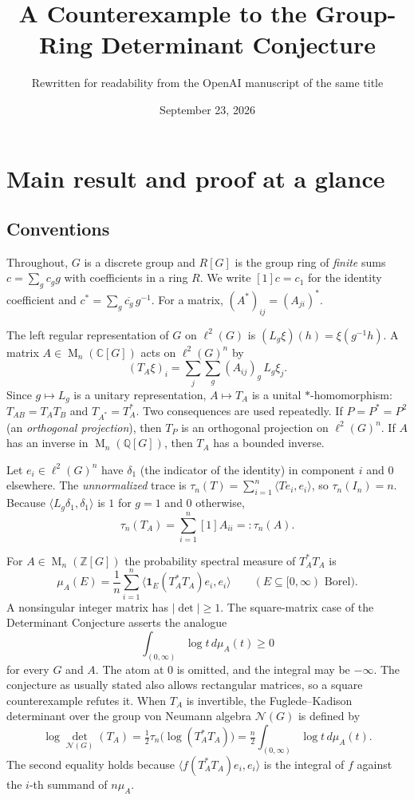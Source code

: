 \documentclass[11pt]{article}
\title{A Counterexample to the Group-Ring Determinant Conjecture}
\author{Rewritten for readability from the OpenAI manuscript of the same title}
\date{September 23, 2026}
\theoremstyle{remark}
\numberwithin{equation}{section}
\newcommand{\Z}{\mathbb Z}
\newcommand{\Q}{\mathbb Q}
\newcommand{\C}{\mathbb C}
\newcommand{\Mat}{\operatorname{M}}
\newcommand{\N}{\mathcal N}
\begin{document}
\maketitle

\section{Main result and proof at a glance}
\label{sec:introduction}

\subsection*{Conventions}

Throughout, $G$ is a discrete group and $R[G]$ is the group ring of \emph{finite} sums $c=\sum_g c_g g$ with coefficients in a ring $R$. We write $[1]c=c_1$ for the identity coefficient and $c^*=\sum_g\overline{c_g}\,g^{-1}$. For a matrix, $(A^*)_{ij}=(A_{ji})^*$.

The left regular representation of $G$ on $\ell^2(G)$ is $(L_g\xi)(h)=\xi(g^{-1}h)$. A matrix $A\in\Mat_n(\C[G])$ acts on $\ell^2(G)^n$ by
\[
 (T_A\xi)_i=\sum_{j}\sum_g (A_{ij})_g\,L_g\xi_j .
\]
Since $g\mapsto L_g$ is a unitary representation, $A\mapsto T_A$ is a unital $*$-homomorphism: $T_{AB}=T_AT_B$ and $T_{A^*}=T_A^*$. Two consequences are used repeatedly. If $P=P^*=P^2$ (an \emph{orthogonal projection}), then $T_P$ is an orthogonal projection on $\ell^2(G)^n$. If $A$ has an inverse in $\Mat_n(\Q[G])$, then $T_A$ has a bounded inverse.

Let $e_i\in\ell^2(G)^n$ have $\delta_1$ (the indicator of the identity) in component $i$ and $0$ elsewhere. The \emph{unnormalized} trace is $\tau_n(T)=\sum_{i=1}^n\langle Te_i,e_i\rangle$, so $\tau_n(I_n)=n$. Because $\langle L_g\delta_1,\delta_1\rangle$ is $1$ for $g=1$ and $0$ otherwise,
\[
 \tau_n(T_A)=\sum_{i=1}^n[1]A_{ii}=: \tau_n(A).
\]

For $A\in\Mat_n(\Z[G])$ the probability spectral measure of $T_A^*T_A$ is
\[
 \mu_A(E)=\frac1n\sum_{i=1}^n\langle \mathbf1_E(T_A^*T_A)e_i,e_i\rangle
 \qquad(E\subseteq[0,\infty)\text{ Borel}).
\]
A nonsingular integer matrix has $|\det|\ge1$. The square-matrix case of the Determinant Conjecture \cite[Conjecture 13.2]{Luck2002} asserts the analogue
\begin{equation}\label{eq:conjecture}
 \int_{(0,\infty)}\log t\,d\mu_A(t)\ge0
\end{equation}
for every $G$ and $A$. The atom at $0$ is omitted, and the integral may be $-\infty$. The conjecture as usually stated also allows rectangular matrices, so a square counterexample refutes it. When $T_A$ is invertible, the Fuglede--Kadison determinant \cite{FK1952} over the group von Neumann algebra $\N(G)$ is defined by
\begin{equation}\label{eq:normalization}
 \log\det_{\N(G)}(T_A)
 =\tfrac12\tau_n\bigl(\log(T_A^*T_A)\bigr)
 =\tfrac n2\int_{(0,\infty)}\log t\,d\mu_A(t).
\end{equation}
The second equality holds because $\langle f(T_A^*T_A)e_i,e_i\rangle$ is the integral of $f$ against the $i$-th summand of $n\mu_A$.
\end{document}
